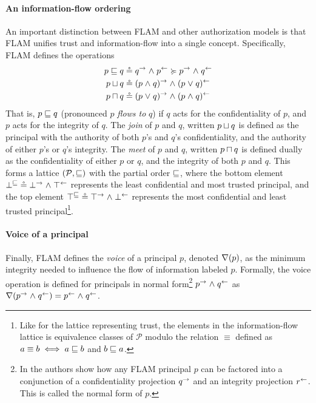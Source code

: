 \paragraph{An information-flow ordering}
An important distinction between FLAM and other authorization models is that FLAM unifies trust and information-flow into a single concept. Specifically, FLAM defines the operations
\begin{align*}
p \sqsubseteq q &\circeq q^{\rightarrow} \mathrel{\land} p^{\leftarrow} \succcurlyeq p^{\rightarrow} \mathrel{\land} q^{\leftarrow}\\
p \sqcup q &\circeq (p \mathrel{\land} q)^{\rightarrow} \mathrel{\land} (p \mathrel{\lor} q)^{\leftarrow} \\
p \sqcap q &\circeq (p \mathrel{\lor} q)^{\rightarrow} \mathrel{\land} (p \mathrel{\land} q)^{\leftarrow}
\end{align*}
That is, $p \sqsubseteq q$ (pronounced $p$ \emph{flows to} $q$) if $q$ acts for the confidentiality of $p$, and $p$ acts for the integrity of $q$. The \emph{join} of $p$ and $q$, written $p \sqcup q$ is defined as the principal with the authority of both $p$'s and $q$'s confidentiality, and the authority of either $p$'s or $q$'s integrity. The \emph{meet} of $p$ and $q$, written $p \sqcap q$ is defined dually as the confidentiality of either $p$ or $q$, and the integrity of both $p$ and $q$.
This forms a lattice $(\mathcal{P}, \sqsubseteq)$ with the partial order $\sqsubseteq$, where the bottom element $\bot^{\sqsubseteq} \circeq \bot^{\rightarrow} \mathrel{\land} \top^{\leftarrow}$ represents the least confidential and most trusted principal, and the top element $\top^{\sqsubseteq} \circeq \top^{\rightarrow} \mathrel{\land} \bot^{\leftarrow}$ represents the most confidential and least trusted principal\footnote{Like for the lattice representing trust, the elements in the information-flow lattice is equivalence classes of $\mathcal{P}$ modulo the relation $\equiv$ defined as $a \equiv b \iff a \sqsubseteq b$ and $b \sqsubseteq a$.}.

\paragraph{Voice of a principal}
Finally, FLAM defines the \emph{voice} of a principal $p$, denoted $\nabla(p)$, as the minimum integrity needed to influence the flow of information labeled $p$. Formally, the voice operation is defined for principals in normal form\footnote{In \cite{Arden:2015:FA:2859845.2859998} the authors show how any FLAM principal $p$ can be factored into a conjunction of a confidentiality projection $q^{\rightarrow}$ and an integrity projection $r^{\leftarrow}$. This is called the normal form of $p$.} $p^{\rightarrow} \mathrel{\land} q^{\leftarrow}$ as $\nabla(p^{\rightarrow} \mathrel{\land} q^{\leftarrow}) = p^{\leftarrow} \mathrel{\land} q^{\leftarrow}$.

